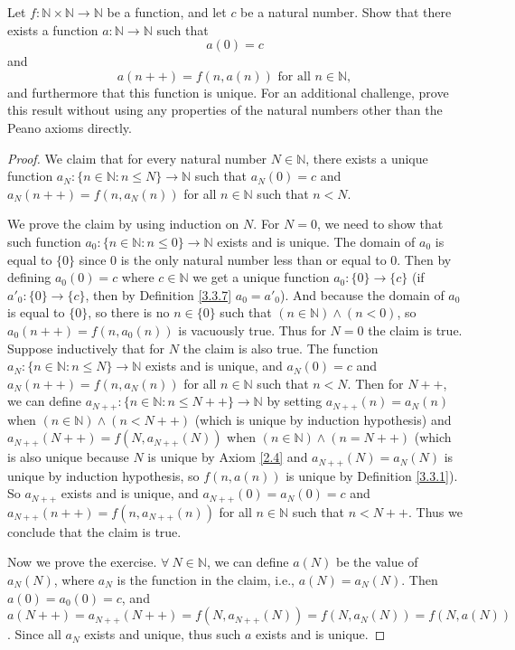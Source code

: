 \begin{exercise}\label{ex 3.5.12}
Let \(f : \mathds{N} \times \mathds{N} \to \mathds{N}\) be a function, and let \(c\) be a natural number.
Show that there exists a function \(a : \mathds{N} \to \mathds{N}\) such that
\[
    a(0) = c
\]
and
\[
    a(n++) = f(n, a(n)) \text{ for all } n \in \mathds{N},
\]
and furthermore that this function is unique.
For an additional challenge, prove this result without using any properties of the natural numbers other than the Peano axioms directly.
\end{exercise}

\begin{proof}
We claim that for every natural number \(N \in \mathds{N}\), there exists a unique function \(a_N : \{n \in \mathds{N} : n \leq N\} \to \mathds{N}\) such that \(a_N(0) = c\) and \(a_N(n++) = f(n, a_{N}(n))\) for all \(n \in \mathds{N}\) such that \(n < N\).

We prove the claim by using induction on \(N\).
For \(N = 0\), we need to show that such function \(a_0 : \{n \in \mathds{N} : n \leq 0\} \to \mathds{N}\) exists and is unique.
The domain of \(a_0\) is equal to \(\{0\}\) since \(0\) is the only natural number less than or equal to \(0\).
Then by defining \(a_0(0) = c\) where \(c \in \mathds{N}\) we get a unique function \(a_0 : \{0\} \to \{c\}\) (if \(a'_0 : \{0\} \to \{c\}\), then by Definition \ref{3.3.7} \(a_0 = a'_0\)).
And because the domain of \(a_0\) is equal to \(\{0\}\), so there is no \(n \in \{0\}\) such that \((n \in \mathds{N}) \land (n < 0)\), so \(a_0(n++) = f(n, a_0(n))\) is vacuously true.
Thus for \(N = 0\) the claim is true.
Suppose inductively that for \(N\) the claim is also true.
The function \(a_N : \{n \in \mathds{N} : n \leq N\} \to \mathds{N}\) exists and is unique, and \(a_N(0) = c\) and \(a_N(n++) = f(n, a_N(n))\) for all \(n \in \mathds{N}\) such that \(n < N\).
Then for \(N++\), we can define \(a_{N++} : \{n \in \mathds{N} : n \leq N++\} \to \mathds{N}\) by setting \(a_{N++}(n) = a_N(n)\) when \((n \in \mathds{N}) \land (n < N++)\) (which is unique by induction hypothesis) and \(a_{N++}(N++) = f(N, a_{N++}(N))\) when \((n \in \mathds{N}) \land (n = N++)\) (which is also unique because \(N\) is unique by Axiom \ref{2.4} and \(a_{N++}(N) = a_N(N)\) is unique by induction hypothesis, so \(f(n, a(n))\) is unique by Definition \ref{3.3.1}).
So \(a_{N++}\) exists and is unique, and \(a_{N++}(0) = a_N(0) = c\) and \(a_{N++}(n++) = f(n, a_{N++}(n))\) for all \(n \in \mathds{N}\) such that \(n < N++\).
Thus we conclude that the claim is true.

Now we prove the exercise.
\(\forall\ N \in \mathds{N}\), we can define \(a(N)\) be the value of \(a_N(N)\), where \(a_N\) is the function in the claim, i.e., \(a(N) = a_{N}(N)\).
Then \(a(0) = a_0(0) = c\), and \(a(N++) = a_{N++}(N++) = f(N, a_{N++}(N)) = f(N, a_{N}(N)) = f(N, a(N))\).
Since all \(a_N\) exists and unique, thus such \(a\) exists and is unique.
\end{proof}

